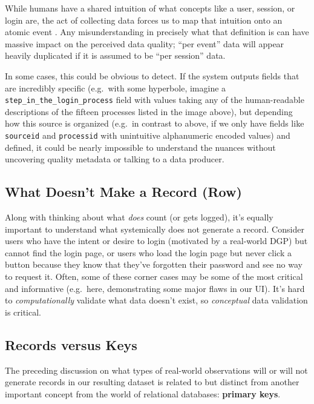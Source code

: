 \documentclass[
]{krantz}
\begin{document}
While humans have a shared intuition of what concepts like a user, session, or login are, the act of collecting data forces us to map that intuition onto an atomic event .
Any misunderstanding in precisely what that definition is can have massive impact on the perceived data quality; ``per event'' data will appear heavily duplicated if it is assumed to be ``per session'' data.

In some cases, this could be obvious to detect.
If the system outputs fields that are incredibly specific (e.g.~with some hyperbole, imagine a \texttt{step\_in\_the\_login\_process} field with values taking any of the human-readable descriptions of the fifteen processes listed in the image above), but depending how this source is organized (e.g.~in contrast to above, if we only have fields like \texttt{sourceid} and \texttt{processid} with unintuitive alphanumeric encoded values) and defined, it could be nearly impossible to understand the nuances without uncovering quality metadata or talking to a data producer.

\hypertarget{what-doesnt-make-a-record-row}{%
\subsection{What Doesn't Make a Record (Row)}\label{what-doesnt-make-a-record-row}}

Along with thinking about what \emph{does} count (or gets logged), it's equally important to understand what systemically does not generate a record. Consider users who have the intent or desire to login (motivated by a real-world DGP) but cannot find the login page, or users who load the login page but never click a button because they know that they've forgotten their password and see no way to request it.
Often, some of these corner cases may be some of the most critical and informative (e.g.~here, demonstrating some major flaws in our UI).
It's hard to \emph{computationally} validate what data doesn't exist, so \emph{conceptual} data validation is critical.

\hypertarget{records-versus-keys}{%
\subsection{Records versus Keys}\label{records-versus-keys}}

The preceding discussion on what types of real-world observations will or will not generate records in our resulting dataset is related to but distinct from another important concept from the world of relational databases: \textbf{primary keys}.
\end{document}
